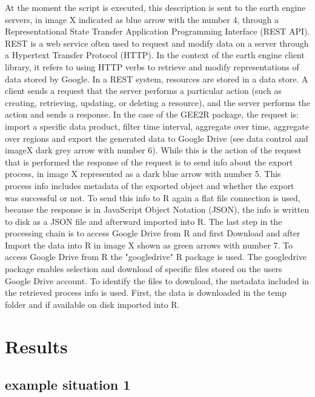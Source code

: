 \documentclass[11pt,twoside,a4paper,final]{report}
\begin{document}
At the moment the script is executed, this description is sent to the earth engine servers, in image X indicated as blue arrow with the number 4, through a Representational State Transfer Application Programming Interface (REST API). REST is a web service often used to request and modify data on a server through a Hypertext Transfer Protocol (HTTP).
In the context of the earth engine client library, it refers to using HTTP verbs to retrieve and modify representations of data stored by Google.
In a REST system, resources are stored in a data store. A client sends a request that the server performs a particular action (such as creating, retrieving, updating, or deleting a resource), and the server performs the action and sends a response. In the case of the GEE2R package, the request is: import a specific data product, filter time interval, aggregate over time, aggregate over regions and export the generated data to Google Drive (see data control and imageX dark grey arrow with number 6). While this is the action of the request that is performed the response of the request is to send info about the export process, in image X represented as a dark blue arrow with number 5. This process info includes metadata of the exported object and whether the export was successful or not. To send this info to R again a flat file connection is used, because the response is in JavaScript Object Notation (JSON), the info is written to disk as a JSON file and afterward imported into R. The last step in the processing chain is to access Google Drive from R and first Download and after Import the data into R in image X shown as green arrows with number 7. To access Google Drive from R the "googledrive" R package is used. The googledrive package enables selection and download of specific files stored on the users Google Drive account. To identify the files to download, the metadata included in the retrieved process info is used. First, the data is downloaded in the temp folder and if available on disk imported into R.


\chapter{Results}

\section{example situation 1}
\end{document}
